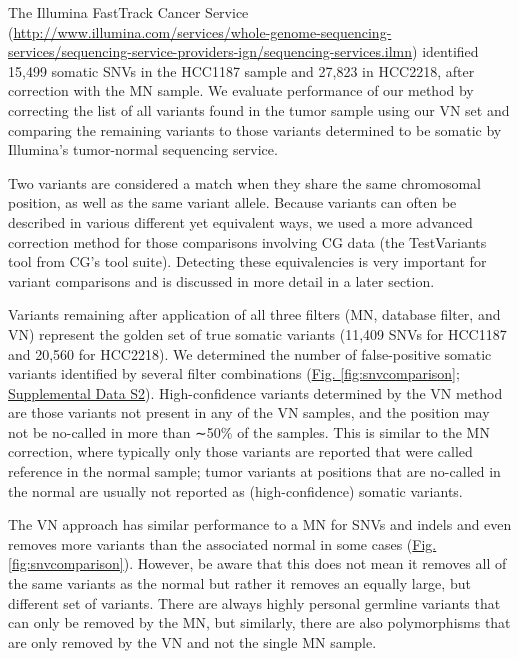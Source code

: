 The Illumina FastTrack Cancer Service (\url{http://www.illumina.com/services/whole-genome-sequencing-services/sequencing-service-providers-ign/sequencing-services.ilmn}) identified 15,499 somatic SNVs in the HCC1187 sample and 27,823 in HCC2218, after correction with the MN sample. We evaluate performance of our method by correcting the list of all variants found in the tumor sample using our VN set and comparing the remaining variants to those variants determined to be somatic by Illumina's tumor-normal sequencing service.

Two variants are considered a match when they share the same chromosomal position, as well as the same variant allele. Because variants can often be described in various different yet equivalent ways, we used a more advanced correction method for those comparisons involving CG data (the TestVariants tool from CG's tool suite). Detecting these equivalencies is very important for variant comparisons and is discussed in more detail in a later section.

Variants remaining after application of all three filters (MN, database filter, and VN) represent the golden set of true somatic variants (11,409 SNVs for HCC1187 and 20,560 for HCC2218). We determined the number of false-positive somatic variants identified by several filter combinations (\hyperref[fig:snvcomparison]{Fig. \ref{fig:snvcomparison}}; \href{https://genome.cshlp.org/content/25/9/1382/suppl/DC1}{Supplemental Data S2}). High-confidence variants determined by the VN method are those variants not present in any of the VN samples, and the position may not be no-called in more than ∼50\% of the samples. This is similar to the MN correction, where typically only those variants are reported that were called reference in the normal sample; tumor variants at positions that are no-called in the normal are usually not reported as (high-confidence) somatic variants.

The VN approach has similar performance to a MN for SNVs and indels and even removes more variants than the associated normal in some cases (\hyperref[fig:snvcomparison]{Fig. \ref{fig:snvcomparison}}). However, be aware that this does not mean it removes all of the same variants as the normal but rather it removes an equally large, but different set of variants. There are always highly personal germline variants that can only be removed by the MN, but similarly, there are also polymorphisms that are only removed by the VN and not the single MN sample.

